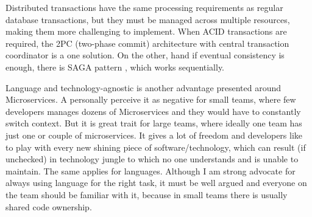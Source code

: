 
Distributed transactions have the same processing requirements as regular database transactions, but they must be managed across multiple resources, making them more challenging to implement. When ACID transactions are required, the 2PC \cite{2PC_PATTERN} (two-phase commit) architecture with central transaction coordinator is a one solution. On the other, hand if eventual consistency is enough, there is SAGA pattern \cite{SAGA_PATTERN}, which works sequentially.

Language and technology-agnostic is another advantage presented around Microservices. A personally perceive it as negative for small teams, where few developers manages dozens of Microservices and they would have to constantly switch context. But it is great trait for large teams, where ideally one team has just one or couple of microservices. It gives a lot of freedom and developers like to play with every new shining piece of software/technology, which can result (if unchecked) in technology jungle to which no one understands and is unable to maintain. The same applies for languages. Although I am strong advocate for always using language for the right task, it must be well argued and everyone on the team should be familiar with it, because in small teams there is usually shared code ownership.

